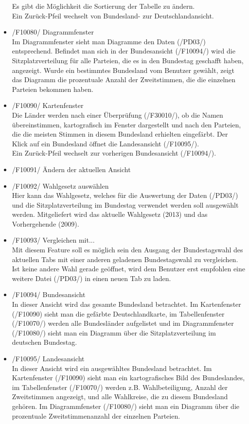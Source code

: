 \documentclass[10pt,a4paper]{article}
\begin{document}
\begin{itemize}
	Es gibt die Möglichkeit die Sortierung der Tabelle zu ändern. \\
	Ein Zurück-Pfeil wechselt von Bundesland- zur Deutschlandansicht.
	\item /F10080/ Diagrammfenster \hfill \\
	Im Diagrammfenster sieht man Diagramme den Daten (/PD03/) entsprechend. Befindet man sich in der Bundesansicht (/F10094/) wird die Sitzplatzverteilung für alle Parteien, die es in den Bundestag geschafft haben, angezeigt. Wurde ein bestimmtes Bundesland vom Benutzer gewählt, zeigt das Diagramm die prozentuale Anzahl der Zweitstimmen, die die einzelnen Parteien bekommen haben.
	\item /F10090/ Kartenfenster \hfill \\
	Die Länder werden nach einer Überprüfung (/F30010/), ob die Namen übereinstimmen, kartografisch im Fenster dargestellt und nach den Parteien, die die meisten Stimmen in diesem Bundesland erhielten eingefärbt. Der Klick auf ein Bundesland öffnet die Landesansicht (/F10095/). \\
	Ein Zurück-Pfeil wechselt zur vorherigen Bundesansicht (/F10094/).
	\item /F10091/ Ändern der aktuellen Ansicht \hfill \\
	
	\item /F10092/ Wahlgesetz auswählen \hfill \\
	Hier kann das Wahlgesetz, welches für die Auswertung der Daten (/PD03/) und die Sitzplatzverteilung im Bundestag verwendet werden soll ausgewählt werden. Mitgeliefert wird das aktuelle Wahlgesetz (2013) und das Vorhergehende (2009).
	\item /F10093/ Vergleichen mit... \hfill \\
	Mit diesem Feature soll es möglich sein den Ausgang der Bundestagswahl des aktuellen Tabs mit einer anderen geladenen Bundestagswahl zu vergleichen. Ist keine andere Wahl gerade geöffnet, wird dem Benutzer erst empfohlen eine weitere Datei (/PD03/) in einen neuen Tab zu laden.
	\item /F10094/ Bundesansicht \hfill \\
	In dieser Ansicht wird das gesamte Bundesland betrachtet. Im Kartenfenster (/F10090) sieht man die gefärbte Deutschlandkarte, im Tabellenfenster (/F10070/) werden alle Bundesländer aufgelistet und im Diagrammfenster (/F10080/) sieht man ein Diagramm über die Sitzplatzverteilung im deutschen Bundestag.
	\item /F10095/ Landesansicht \hfill \\
	In dieser Ansicht wird ein ausgewähltes Bundesland betrachtet. Im Kartenfenster (/F10090) sieht man ein kartografisches Bild des Bundeslandes, im Tabellenfenster (/F10070/) werden z.B. Wahlbeteiligung, Anzahl der Zweitstimmen angezeigt, und alle Wahlkreise, die zu diesem Bundesland gehören. Im Diagrammfenster (/F10080/) sieht man ein Diagramm über die prozentuale Zweitstimmenanzahl der einzelnen Parteien.
	
\end{itemize}
\end{document}
